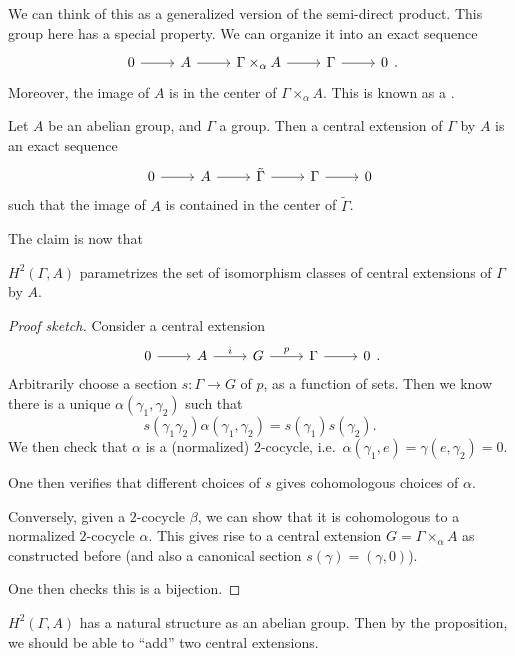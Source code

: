 \documentclass[a4paper]{article}
\begin{document}
We can think of this as a generalized version of the semi-direct product. This group here has a special property. We can organize it into an exact sequence
\[
  \begin{tikzcd}
    0 \ar[r] & A \ar[r] & \Gamma \times_\alpha A \ar[r] & \Gamma \ar[r] & 0
  \end{tikzcd}.
\]
Moreover, the image of $A$ is in the center of $\Gamma \times_\alpha A$. This is known as a .
\begin{defi}
  Let $A$ be an abelian group, and $\Gamma$ a group. Then a central extension of $\Gamma$ by $A$ is an exact sequence
  \[
    \begin{tikzcd}
      0 \ar[r] & A \ar[r] & \tilde{\Gamma} \ar[r] & \Gamma \ar[r] & 0
    \end{tikzcd}
  \]
  such that the image of $A$ is contained in the center of $\tilde{\Gamma}$.
\end{defi}
The claim is now that

\begin{prop}
  $H^2(\Gamma, A)$ parametrizes the set of isomorphism classes of central extensions of $\Gamma$ by $A$.
\end{prop}

\begin{proof}[Proof sketch]
  Consider a central extension
  \[
    \begin{tikzcd}
      0 \ar[r] & A \ar[r, "i"] & G \ar[r, "p"] & \Gamma \ar[r] & 0
    \end{tikzcd}.
  \]
  Arbitrarily choose a section $s: \Gamma \to G$ of $p$, as a function of sets. Then we know there is a unique $\alpha(\gamma_1, \gamma_2)$ such that
  \[
    s(\gamma_1 \gamma_2) \alpha(\gamma_1, \gamma_2) = s(\gamma_1) s(\gamma_2).
  \]
  We then check that $\alpha$ is a (normalized) $2$-cocycle, i.e.\ $\alpha(\gamma_1, e) = \gamma(e, \gamma_2) = 0$.

  One then verifies that different choices of $s$ gives cohomologous choices of $\alpha$.

  Conversely, given a $2$-cocycle $\beta$, we can show that it is cohomologous to a normalized $2$-cocycle $\alpha$. This gives rise to a central extension $G = \Gamma \times_\alpha A$ as constructed before (and also a canonical section $s(\gamma) = (\gamma, 0)$).

  One then checks this is a bijection.
\end{proof}

\begin{ex}
  $H^2(\Gamma, A)$ has a natural structure as an abelian group. Then by the proposition, we should be able to ``add'' two central extensions.
\end{ex}
\end{document}
